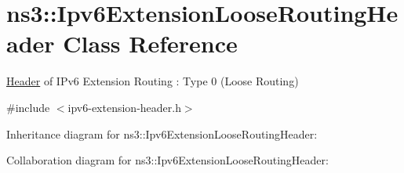 \hypertarget{classns3_1_1Ipv6ExtensionLooseRoutingHeader}{}\section{ns3\+:\+:Ipv6\+Extension\+Loose\+Routing\+Header Class Reference}
\label{classns3_1_1Ipv6ExtensionLooseRoutingHeader}


\hyperlink{classns3_1_1Header}{Header} of I\+Pv6 Extension Routing \+: Type 0 (Loose Routing)  




{\ttfamily \#include $<$ipv6-\/extension-\/header.\+h$>$}



Inheritance diagram for ns3\+:\+:Ipv6\+Extension\+Loose\+Routing\+Header\+:


Collaboration diagram for ns3\+:\+:Ipv6\+Extension\+Loose\+Routing\+Header\+:
